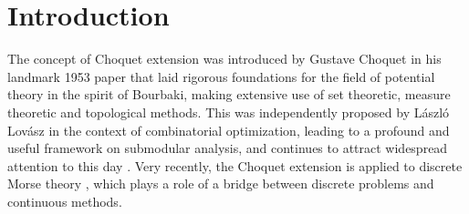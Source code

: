 \documentclass[12pt,a4paper]{article}
\begin{document}
\section{Introduction}
The concept of Choquet extension was introduced by Gustave Choquet in his landmark 1953 paper \cite{Choquet} that laid rigorous foundations for the field of potential theory in the spirit of Bourbaki, making extensive use of set theoretic, measure theoretic and topological methods. 
This was independently proposed by L\'aszl\'o Lov\'asz \cite{Lovasz83} in the context of combinatorial optimization, leading to a profound and useful framework on submodular analysis, and continues to attract widespread attention to this day \cite{Huber14,Lovasz25}. 
Very recently, the  Choquet extension is applied to %
discrete Morse theory \cite{Jost/Zhang24a}, which plays a role of a bridge between discrete problems and continuous methods. 
\end{document}
